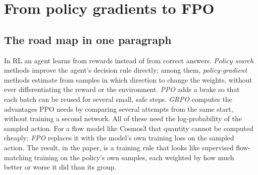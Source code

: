 \chapter{From policy gradients to FPO}\label{ch:rl-to-fpo}
\begin{abstract}
These notes assume Calculus I--II and basic probability, and no background in reinforcement learning (RL), multivariable calculus or generative flow models. They build, in order: the few multivariable tools needed (\cref{fpo:sec:toolkit}); the RL problem (\cref{fpo:sec:rl}); the two families of methods and why the paper belongs to \emph{policy search} (\cref{fpo:sec:families}); policy-gradient methods, from the basic formula to REINFORCE and actor--critic (\cref{fpo:sec:pg}); PPO, which makes policy gradients stable and reusable (\cref{fpo:sec:ppo}); GRPO, the critic-free variant the paper uses for its advantages (\cref{fpo:sec:grpo}); flow models from scratch, starting from differential equations, and why they break PPO (\cref{fpo:sec:flow}); and FPO, which repairs PPO for flow models (\cref{fpo:sec:fpo}).  maps every symbol onto Eqs.~(13)--(16) of the paper. Green boxes introduce a concept the first time it appears; grey ``In the paper'' boxes give the corresponding symbol, equation or line of Algorithm~1 in AWYI.
\end{abstract}

\section*{The road map in one paragraph}
In RL an agent learns from rewards instead of from correct answers. \emph{Policy search} methods improve the agent's decision rule directly; among them, \emph{policy-gradient} methods estimate from samples in which direction to change the weights, without ever differentiating the reward or the environment. \emph{PPO} adds a brake so that each batch can be reused for several small, safe steps. \emph{GRPO} computes the advantages PPO needs by comparing several attempts from the same start, without training a second network. All of these need the log-probability of the sampled action. For a flow model like Cosmos3 that quantity cannot be computed cheaply; \emph{FPO} replaces it with the model's own training loss on the sampled action. The result, in the paper, is a training rule that looks like supervised flow-matching training on the policy's own samples, each weighted by how much better or worse it did than its group.

